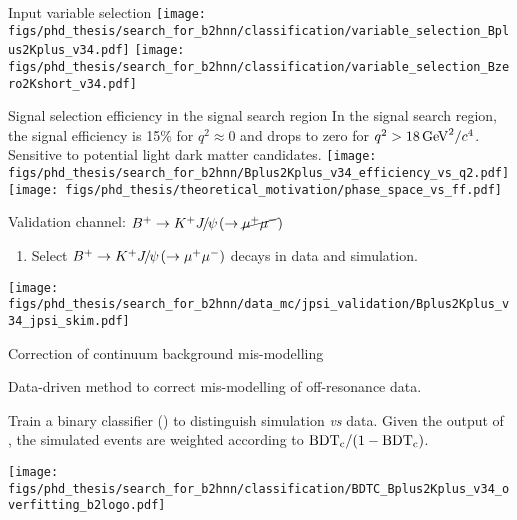\begin{frame}[noframenumbering]{Input variable selection}
\centering
\texttt{[image: figs/phd\_thesis/search\_for\_b2hnn/classification/variable\_selection\_Bplus2Kplus\_v34.pdf]}
\texttt{[image: figs/phd\_thesis/search\_for\_b2hnn/classification/variable\_selection\_Bzero2Kshort\_v34.pdf]}
\end{frame}
\begin{frame}[noframenumbering]{Signal selection efficiency in the signal search region}
\bi
\itemi In the signal search region, the signal efficiency is 15\% for $q^2\approx0$ and drops to zero for $q^2>18\mathrm{\,Ge\kern -0.1em V}^2/c^4$.
\bi
\itemii Sensitive to potential light dark matter candidates.
\ei
\ei
\vspace{0.5cm}
\centering
\texttt{[image: figs/phd\_thesis/search\_for\_b2hnn/Bplus2Kplus\_v34\_efficiency\_vs\_q2.pdf]}
\texttt{[image: figs/phd\_thesis/theoretical\_motivation/phase\_space\_vs\_ff.pdf]}
\end{frame}
\begin{frame}[noframenumbering]{Validation channel: $B^+\rightarrow K^+{J\mskip -3mu/\mskip -2mu\psi\mskip 2mu}(\rightarrow\cancel{\mu^+\mu^-})$}
\begin{enumerate}
\item Select $B^+\rightarrow K^+{J\mskip -3mu/\mskip -2mu\psi\mskip 2mu}(\rightarrow\mu^+\mu^-)$ decays in data and simulation.
\bi
{}
\ei
\end{enumerate}
\vspace{0.25cm}
\centering
\texttt{[image: figs/phd\_thesis/search\_for\_b2hnn/data\_mc/jpsi\_validation/Bplus2Kplus\_v34\_jpsi\_skim.pdf]}
\end{frame}
\begin{frame}[noframenumbering]{Correction of continuum background mis-modelling}
\bi
\item Data-driven method to correct mis-modelling of off-resonance data.
\begin{enumerate}
	\itemii Train a binary classifier (\bdtc) to distinguish {\color{blue}simulation} \textit{vs} {\color{red}data}.
\itemii Given the output of \bdtc, the simulated events are weighted according to $\mathrm{\mathrm{BDT_c}}/(1-\mathrm{\mathrm{BDT_c}})$.
\end{enumerate}
\ei
\vspace{0.5cm}
\centering
\texttt{[image: figs/phd\_thesis/search\_for\_b2hnn/classification/BDTC\_Bplus2Kplus\_v34\_overfitting\_b2logo.pdf]}
\end{frame}
